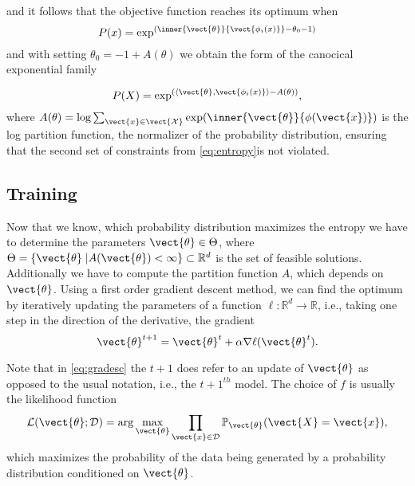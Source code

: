     and it follows that the objective function reaches its optimum when 
    \begin{equation}   
    P(x) = \exp^{(\inner{\vect{\theta}}{\vect{\phi_i(x)}} - \theta_0 - 1)}
    \end{equation} 
    and with setting $\theta_0 = -1 + A(\theta) $ we obtain the form of the canocical exponential family

    \begin{equation}
        P(X) = \exp^{(\langle\vect{\theta}, \vect{\phi_i(x)} \rangle - A(\theta))},
    \end{equation}
    where $A(\theta) = \log \sum_{\vect{x}\in \vect{\mathcal{X}}} \exp(\inner{\vect{\theta}}{\phi(\vect{x})})$ is the log partition function, the normalizer of the probability distribution, ensuring that the second set of constraints from \eq\ref{eq:entropy}is not violated.

    \subsection{Training}
    \label{ssec:train}

    Now that we know, which probability distribution maximizes the entropy we have to determine the parameters $\vect{\theta} \in \Theta$, where $\Theta = \{\vect{\theta} \;\lvert A(\vect{\theta}) < \infty\} \subset \mathbb{R}^d$ is the set of feasible solutions.
    Additionally we have to compute the partition function $A$, which depends on $\vect{\theta}$.
    Using a first order gradient descent method, we can find the optimum by iteratively updating the parameters of a function $\ell: \mathbb{R}^d \rightarrow \mathbb{R}$, i.e., taking one step in the direction of the derivative, the gradient 
    \begin{equation}
        \label{eq:gradesc}
        \vect{\theta}^{t+1} = \vect{\theta}^{t} + \alpha \nabla \ell(\vect{\theta}^{t}).
    \end{equation}

    Note that in \eq\ref{eq:gradesc} the $t+1$ does refer to an update of $\vect{\theta}$ as opposed to the usual notation, i.e., the $t+1^{th}$ model. 
    The choice of $f$ is usually the likelihood function
    \begin{equation}
        \label{eq:likelihood}
        \mathcal{L}(\vect{\theta} ; \mathcal{D}) = \arg\max_{\vect{\theta}}\prod_{\vect{x} \in \mathcal{D}}  \mathbb{P}_{\vect{\theta}}(\vect{X} = \vect{x}),
    \end{equation}
    which maximizes the probability of the data being generated by a probability distribution conditioned on $\vect{\theta}$.

